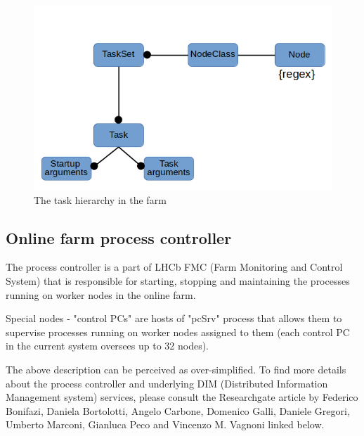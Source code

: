 \documentclass{customization}
\begin{document}
\begin{figure}[H]
    \centering
    \includegraphics[scale=0.45]{images/hierarchy.png}
    \caption{The task hierarchy in the farm}
    \label{fig:hierarchy}
\end{figure}


\subsection{Online farm process controller}
\hspace{0.6cm}

The process controller is a part of LHCb FMC (Farm Monitoring and Control System) that is responsible for starting, stopping and maintaining the processes running on worker nodes in the online farm.
\newline

\noindent
Special nodes - "control PCs" are hosts of "pcSrv" process that allows them to supervise processes running on worker nodes assigned to them (each control PC in the current system oversees up to 32 nodes).
\newline

\noindent
The above description can be perceived as over-simplified. To find more details about the process controller and underlying DIM (Distributed Information Management system) services, please consult the Researchgate article by Federico Bonifazi, Daniela Bortolotti, Angelo Carbone, Domenico Galli, Daniele Gregori, Umberto Marconi, Gianluca Peco and Vincenzo M. Vagnoni linked below.
\newline 

\noindent{}
    
\end{document}
